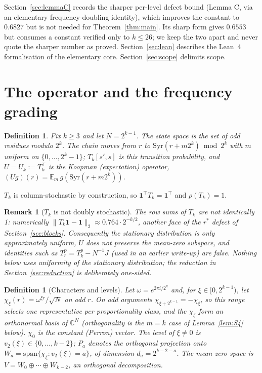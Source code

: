 \documentclass[12pt,a4paper]{article}
\newtheorem{definition}[theorem]{Definition}
\newtheorem{remark}[theorem]{Remark}
\newcommand{\C}{\mathbb{C}}
\newcommand{\Syr}{\mathrm{Syr}}
\newcommand{\vtwo}{v_2}
\begin{document}
Section~\ref{sec:lemmaC} records the sharper per-level defect bound (Lemma C, via an elementary
frequency-doubling identity), which improves the constant to $0.6827$ but is not needed for
Theorem~\ref{thm:main}. Its sharp form gives $0.6553$ but consumes a constant verified only to
$k \leq 26$; we keep the two apart and never quote the sharper number as proved. Section~\ref{sec:lean} describes the Lean~4 formalisation of the
elementary core. Section~\ref{sec:scope} delimits scope.

\section{The operator and the frequency grading}\label{sec:setup}

\begin{definition}\label{def:T}
Fix $k \ge 3$ and let $N = 2^{k-1}$. The state space is the set of odd residues modulo $2^k$.
The chain moves from $r$ to $\Syr(r + m 2^k) \bmod 2^k$ with $m$ uniform on $\{0, \dots, 2^k-1\}$;
$T_k[s', s]$ is this transition probability, and $U = U_k := T_k^{\!\top}$ is the Koopman
(expectation) operator, $(Ug)(r) = \mathbb{E}_m\, g\!\left(\Syr(r + m 2^k)\right)$.
\end{definition}

$T_k$ is column-stochastic by construction, so $\mathbf{1}^{\!\top} T_k = \mathbf{1}^{\!\top}$
and $\rho(T_k) = 1$.

\begin{remark}[$T_k$ is not doubly stochastic]\label{rem:notds}
The row sums of $T_k$ are \emph{not} identically 1: numerically
$\|T_k \mathbf{1} - \mathbf{1}\|_2 \approx 0.764 \cdot 2^{-k/2}$, another face of the $r^\ast$
defect of Section~\ref{sec:blocks}. Consequently the stationary distribution is only
approximately uniform, $U$ does not preserve the mean-zero subspace, and identities such as
$T_r^p = T_k^p - N^{-1} J$ (used in an earlier write-up) are false. Nothing below uses
uniformity of the stationary distribution; the reduction in Section~\ref{sec:reduction} is
deliberately one-sided.
\end{remark}

\begin{definition}[Characters and levels]\label{def:levels}
Let $\omega = e^{2\pi i / 2^k}$ and, for $\xi \in [0, 2^{k-1})$, let
$\chi_\xi(r) = \omega^{\xi r}/\sqrt{N}$ on odd $r$. On odd arguments
$\chi_{\xi + 2^{k-1}} = -\chi_\xi$, so this range selects one representative per proportionality
class, and the $\chi_\xi$ form an orthonormal basis of $\C^N$ (orthogonality is the $m = k$ case
of Lemma~\ref{lem:S4} below). $\chi_0$ is the constant (Perron) vector. The \emph{level} of
$\xi \neq 0$ is $\vtwo(\xi) \in \{0, \dots, k-2\}$; $P_a$ denotes the orthogonal projection onto
$W_a = \mathrm{span}\{\chi_\xi : \vtwo(\xi) = a\}$, of dimension $d_a = 2^{k-2-a}$. The mean-zero
space is $V = W_0 \oplus \cdots \oplus W_{k-2}$, an orthogonal decomposition.
\end{definition}
\end{document}
